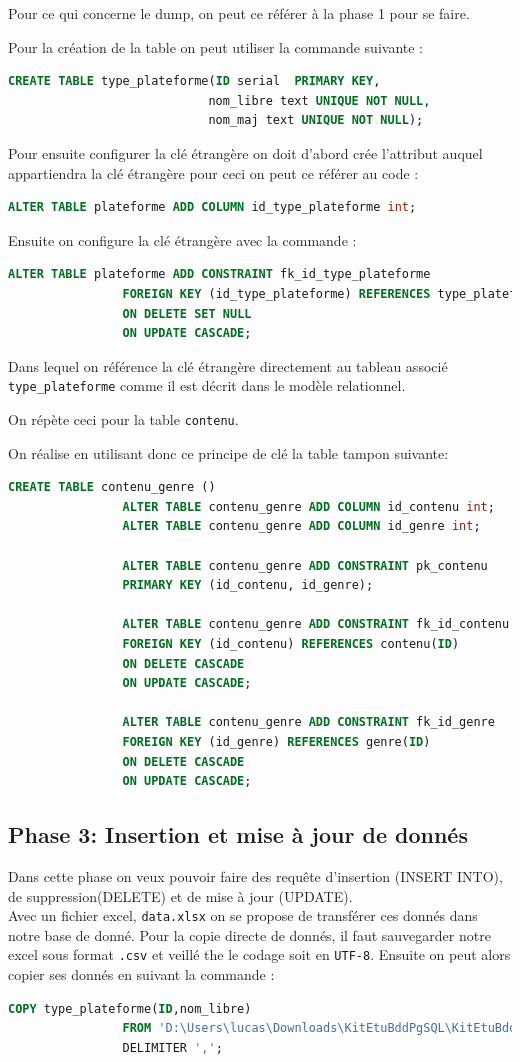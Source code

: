 \documentclass[11pt, openright]{book}
\begin{document}
Pour ce qui concerne le dump, on peut ce référer à la phase 1 pour se faire.

Pour la création de la table on peut utiliser la commande suivante :
\begin{lstlisting}[language=SQL]
				CREATE TABLE type_plateforme(ID serial 	PRIMARY KEY, 
							nom_libre text UNIQUE NOT NULL,
							nom_maj text UNIQUE NOT NULL);
			\end{lstlisting}
Pour ensuite configurer la clé étrangère on doit d'abord crée l'attribut auquel appartiendra la clé étrangère pour ceci on peut ce référer au code :
\begin{lstlisting}[language=SQL]
				ALTER TABLE plateforme ADD COLUMN id_type_plateforme int;
			\end{lstlisting}
Ensuite on configure la clé étrangère avec la commande :
\begin{lstlisting}[language=SQL]
				ALTER TABLE plateforme ADD CONSTRAINT fk_id_type_plateforme
				FOREIGN KEY (id_type_plateforme) REFERENCES type_plateforme(ID)
				ON DELETE SET NULL
				ON UPDATE CASCADE;
			\end{lstlisting}
Dans lequel on référence la clé étrangère directement au tableau associé \texttt{type\_plateforme} comme il est décrit dans le modèle relationnel.

On répète ceci pour la table \texttt{contenu}.

On réalise en utilisant donc ce principe de clé la table tampon suivante:
\begin{lstlisting}[language=SQL]
				CREATE TABLE contenu_genre ()
				ALTER TABLE contenu_genre ADD COLUMN id_contenu int;
				ALTER TABLE contenu_genre ADD COLUMN id_genre int;

				ALTER TABLE contenu_genre ADD CONSTRAINT pk_contenu
				PRIMARY KEY (id_contenu, id_genre);

				ALTER TABLE contenu_genre ADD CONSTRAINT fk_id_contenu
				FOREIGN KEY (id_contenu) REFERENCES contenu(ID)
				ON DELETE CASCADE
				ON UPDATE CASCADE;

				ALTER TABLE contenu_genre ADD CONSTRAINT fk_id_genre
				FOREIGN KEY (id_genre) REFERENCES genre(ID)
				ON DELETE CASCADE
				ON UPDATE CASCADE;
			\end{lstlisting}

\subsection{Phase 3: Insertion et mise à jour de donnés}

Dans cette phase on veux pouvoir faire des requête d'insertion (INSERT INTO), de suppression(DELETE) et de mise à jour (UPDATE). \\
Avec un fichier excel, \texttt{data.xlsx} on se propose de transférer ces donnés dans notre base de donné.
Pour la copie directe de donnés, il faut sauvegarder notre excel sous format \texttt{.csv} et veillé the le codage soit en \texttt{UTF-8}. Ensuite on peut alors copier ses donnés en suivant la commande :
\begin{lstlisting}[language=SQL]
				COPY type_plateforme(ID,nom_libre)
				FROM 'D:\Users\lucas\Downloads\KitEtuBddPgSQL\KitEtuBddPgSQL' CSV
				DELIMITER ',';
			\end{lstlisting}
\end{document}
